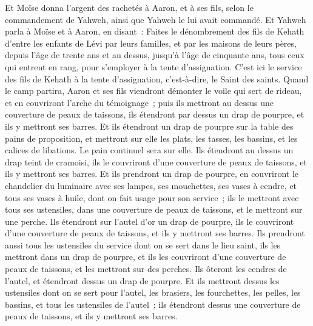 \begin{multicols}{2}
Et Moïse donna l'argent des rachetés à Aaron, et à ses fils, selon le commandement de Yahweh, ainsi que Yahweh le lui avait commandé.
\VerseOne{}Et Yahweh parla à Moïse et à Aaron, en disant~:
Faites le dénombrement des fils de Kehath d'entre les enfants de Lévi par leurs familles, et par les maisons de leurs pères,
depuis l'âge de trente ans et au dessus, jusqu'à l'âge de cinquante ans, tous ceux qui entrent en rang, pour s'employer à la tente d'assignation.
C'est ici le service des fils de Kehath à la tente d'assignation, c'est-à-dire, le Saint des saints.
Quand le camp partira, Aaron et ses fils viendront démonter le voile qui sert de rideau, et en couvriront l'arche du témoignage~;
puis ils mettront au dessus une couverture de peaux de taissons, ils étendront par dessus un drap de pourpre, et ils y mettront ses barres.
Et ils étendront un drap de pourpre sur la table des pains de proposition, et mettront sur elle les plats, les tasses, les bassins, et les calices de libations. Le pain continuel sera sur elle.
Ils étendront au dessus un drap teint de cramoisi, ils le couvriront d'une couverture de peaux de taissons, et ils y mettront ses barres.
Et ils prendront un drap de pourpre, en couvriront le chandelier du luminaire avec ses lampes, ses mouchettes, ses vases à cendre, et tous ses vases à huile, dont on fait usage pour son service~;
ils le mettront avec tous ses ustensiles, dans une couverture de peaux de taissons, et le mettront sur une perche.
Ils étendront sur l'autel d'or un drap de pourpre, ils le couvriront d'une couverture de peaux de taissons, et ils y mettront ses barres.
Ils prendront aussi tous les ustensiles du service dont on se sert dans le lieu saint, ils les mettront dans un drap de pourpre, et ils les couvriront d'une couverture de peaux de taissons, et les mettront sur des perches.
Ils ôteront les cendres de l'autel, et étendront dessus un drap de pourpre.
Et ils mettront dessus les ustensiles dont on se sert pour l'autel, les brasiers, les fourchettes, les pelles, les bassins, et tous les ustensiles de l'autel~; ils étendront dessus une couverture de peaux de taissons, et ils y mettront ses barres.

\end{multicols}
